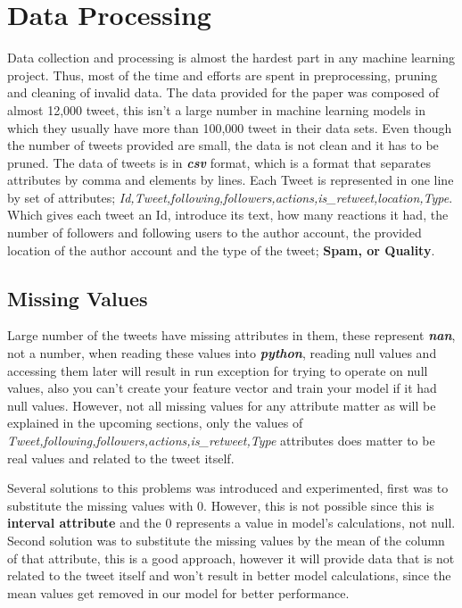 \documentclass[conference]{IEEEtran}
\begin{document}
\section{Data Processing}
Data collection and processing is almost the hardest part in any machine learning project. Thus, most of the time and efforts are spent in preprocessing, pruning and cleaning of invalid data. The data provided for the paper was composed of almost 12,000 tweet, this isn't a large number in machine learning models in which they usually have more than 100,000 tweet in their data sets. Even though the number of tweets provided are small, the data is not clean and it has to be pruned.
The data of tweets is in \textbf{\textit{csv}} format, which is a format that separates attributes by comma and elements by lines. Each Tweet is represented in one line by set of attributes; \textit{Id,Tweet,following,followers,actions,is\_retweet,location,Type}. Which gives each tweet an Id, introduce its text, how many reactions it had, the number of followers and following users to the author account, the provided location of the author account and the type of the tweet; \textbf{Spam, or Quality}.

\subsection{Missing Values}

Large number of the tweets have missing attributes in them, these represent \textbf{\textit{nan}}, not a number, when reading these values into \textbf{\textit{python}}, reading null values and accessing them later will result in run exception for trying to operate on null values, also you can't create your feature vector and train your model if it had null values. However, not all missing values for any attribute matter as will be explained in the upcoming sections, only the values of \textit{Tweet,following,followers,actions,is\_retweet,Type} attributes does matter to be real values and related to the tweet itself.

Several solutions to this problems was introduced and experimented, first was to substitute the missing values with 0. However, this is not possible since this is \textbf{interval attribute} and the 0 represents a value in model's calculations, not null. Second solution was to substitute the missing values by the mean of the column of that attribute, this is a good approach, however it will provide data that is not related to the tweet itself and won't result in better model calculations, since the mean values get removed in our model for better performance.
\end{document}
